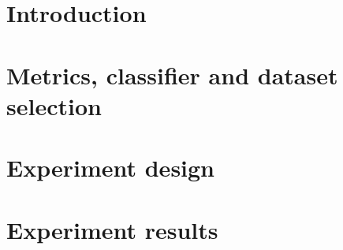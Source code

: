 \documentclass[a4paper,11pt,pdftex,halfparskip,cleardoubleempty]{scrbook}
\begin{document}

\pagestyle{plain} 



\section{Introduction}
\label{sec:introduction}


\section{Metrics, classifier and dataset selection}
\label{sec:selection}


\section{Experiment design}
\label{sec:experiment}


\section{Experiment results}
\label{sec:results}




\end{document}
